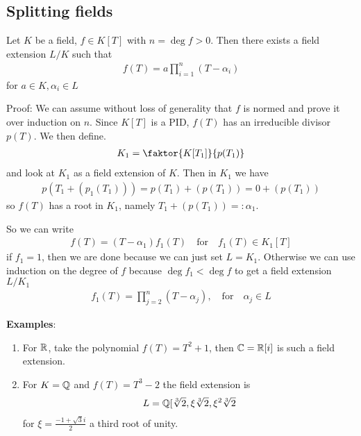 \subsection{Splitting fields}

\begin{theorem}[(Kronecker)]
	Let $K$ be a field, $f \in K[T]$ with $n = \deg f > 0$. Then there exists a field extension $L/K$ such that
	\begin{align*}
		f(T) = a \prod_{i=1}^{n}(T - \alpha_i)
	\end{align*}
	for $a \in K, \alpha_i \in L $
\end{theorem}

Proof: We can assume without loss of generality that $f$ is normed and prove it over induction on $n$. Since $K[T]$ is a PID, $f(T)$ has an irreducible divisor $p(T)$. We then define.
\begin{align*}
	K_1 = \faktor{K[T_1]}{p(T_1)}
\end{align*}
and look at $K_1$ as a field extension of $K$. Then in $K_1$ we have
\begin{align*}
	p\left(
		T_1 + (p_1(T_1))
	\right) = p(T_1) + (p(T_1)) = 0 + (p(T_1))
\end{align*}
so $f(T)$ has a root in $K_1$, namely $T_1 + (p(T_1)) =: \alpha_1$.

So we can write
\begin{align*}
	f(T) = (T - \alpha_1)f_1(T) \quad \text{for} \quad f_1(T) \in K_1[T]
\end{align*}
if $f_1 = 1$, then we are done because we can just set $L = K_1$. 
Otherwise we can use induction on the degree of $f$ because $\deg f_1 < \deg f$ to get a field extension $L/K_1$
\begin{align*}
	f_1(T) = \prod_{j=2}^{n}(T - \alpha_j), \quad \text{for} \quad \alpha_j \in L
\end{align*}


\textbf{Examples}:
\begin{enumerate}
	\item For $\mathbb{R}$, take the polynomial $f(T) = T^2 + 1$, then $\mathbb{C} = \mathbb{R}[i]$ is such a field extension.
	\item For $K = \mathbb{Q}$ and $f(T) = T^3 - 2$ the field extension is
		\begin{align*}
			L = \mathbb{Q}[\sqrt[3]{2}, \xi \sqrt[3]{2}, \xi^2 \sqrt[3]{2}
		\end{align*}
		for $\xi = \frac{-1 + \sqrt{3}i}{2}$ a third root of unity.
\end{enumerate}

